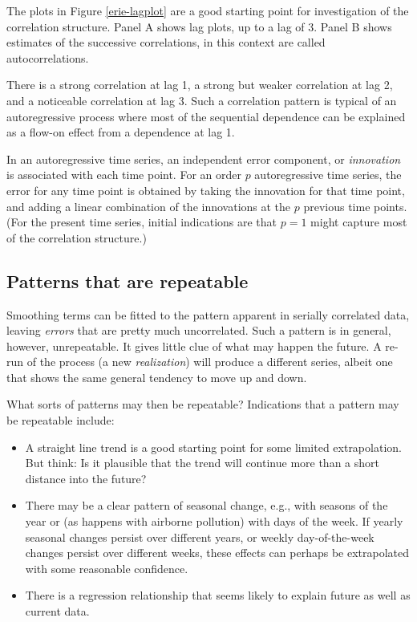 
The plots in Figure \ref{erie-lagplot} are a good starting point for
investigation of the correlation structure.  Panel A shows lag plots,
up to a lag of 3.  Panel B shows estimates of the successive
correlations, in this context are called autocorrelations.

There is a strong correlation at lag 1, a strong but weaker
correlation at lag 2, and a noticeable correlation at lag 3.  Such
a correlation pattern is typical of an autoregressive process where
most of the sequential dependence can be explained as a flow-on
effect from a dependence at lag 1.

In an autoregressive time series, an  independent error component, or \textit{innovation} is
associated with each time point. For an order $p$ autoregressive time
series, the error for any time point is obtained by taking the
innovation for that time point, and adding a linear combination of the
innovations at the $p$ previous time points.  (For the present time
series, initial indications are that $p=1$ might capture most of the
correlation structure.)

\subsection{Patterns that are repeatable}

Smoothing terms can be fitted to the pattern apparent in
  serially correlated data, leaving {\em errors} that are pretty much
  uncorrelated.  Such a pattern is in general, however, unrepeatable.
  It gives little clue of what may happen the future.  A re-run of
  the process (a new {\em realization}) will produce a different
  series, albeit one that shows the same general tendency to move up
  and down.

What sorts of patterns may then be repeatable?  Indications that a
pattern may be repeatable include:
\begin{itemize}
\item A straight line trend is a good starting point for some
  limited extrapolation. But think: Is it plausible that the trend
  will continue more than a short distance into the future?
\item There may be a clear pattern of seasonal change, e.g.,
with seasons of the year or (as happens with airborne pollution)
with days of the week. If yearly seasonal changes persist over
different years, or weekly day-of-the-week changes persist over
different weeks, these effects can perhaps be extrapolated with
some reasonable confidence.
\item There is a regression relationship that seems likely to
explain future as well as current data.
\end{itemize}

